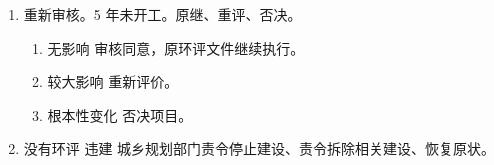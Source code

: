 \begin{enumerate}
\begin{enumerate}
          \item 重新审核。5 年未开工。原继、重评、否决。
                \begin{enumerate}
                  \item 无影响 \yjt 审核同意，原环评文件继续执行。
                  \item 较大影响 \yjt 重新评价。
                  \item 根本性变化 \yjt 否决项目。
                \end{enumerate}
          \item 没有环评 \ydy 违建 \yjt 城乡规划部门责令停止建设、责令拆除相关建设、恢复原状。
        \end{enumerate}
\end{enumerate}
